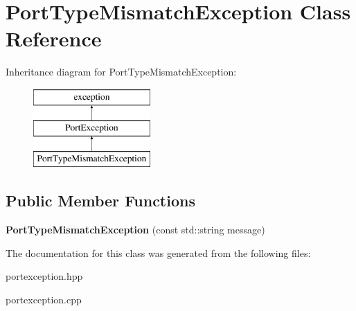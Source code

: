 \hypertarget{class_port_type_mismatch_exception}{}\section{Port\+Type\+Mismatch\+Exception Class Reference}
\label{class_port_type_mismatch_exception}
Inheritance diagram for Port\+Type\+Mismatch\+Exception\+:\begin{figure}[H]
\begin{center}
\leavevmode
\includegraphics[height=3.000000cm]{class_port_type_mismatch_exception}
\end{center}
\end{figure}
\subsection*{Public Member Functions}
\begin{DoxyCompactItemize}
\item 
\hypertarget{class_port_type_mismatch_exception_aa4fa596cc94ecf73220fb1baeba44247}{}{\bfseries Port\+Type\+Mismatch\+Exception} (const std\+::string message)\label{class_port_type_mismatch_exception_aa4fa596cc94ecf73220fb1baeba44247}

\end{DoxyCompactItemize}


The documentation for this class was generated from the following files\+:\begin{DoxyCompactItemize}
\item 
portexception.\+hpp\item 
portexception.\+cpp\end{DoxyCompactItemize}
